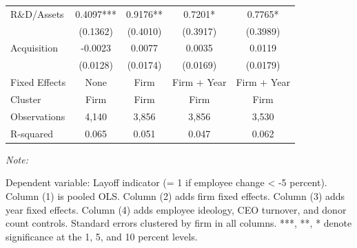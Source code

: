 \documentclass[
  10pt,
]{article}
\begin{document}
\begin{table}[!h]
\begin{threeparttable}
\begin{tabular}[t]{lcccc}
R\&D/Assets & 0.4097*** & 0.9176** & 0.7201* & 0.7765*\\
 & (0.1362) & (0.4010) & (0.3917) & (0.3989)\\
Acquisition & -0.0023 & 0.0077 & 0.0035 & 0.0119\\
 & (0.0128) & (0.0174) & (0.0169) & (0.0179)\\
\midrule
\addlinespace
Fixed Effects & None & Firm & Firm + Year & Firm + Year\\
Cluster & Firm & Firm & Firm & Firm\\
Observations & 4,140 & 3,856 & 3,856 & 3,530\\
R-squared & 0.065 & 0.051 & 0.047 & 0.062\\
\bottomrule
\end{tabular}
\begin{tablenotes}[para]
\item \textit{Note: } 
\item Dependent variable: Layoff indicator (= 1 if employee change < -5 percent). Column (1) is pooled OLS. Column (2) adds firm fixed effects. Column (3) adds year fixed effects. Column (4) adds employee ideology, CEO turnover, and donor count controls. Standard errors clustered by firm in all columns. ***, **, * denote significance at the 1, 5, and 10 percent levels.
\end{tablenotes}
\end{threeparttable}
\end{table}

\newpage
\end{document}
